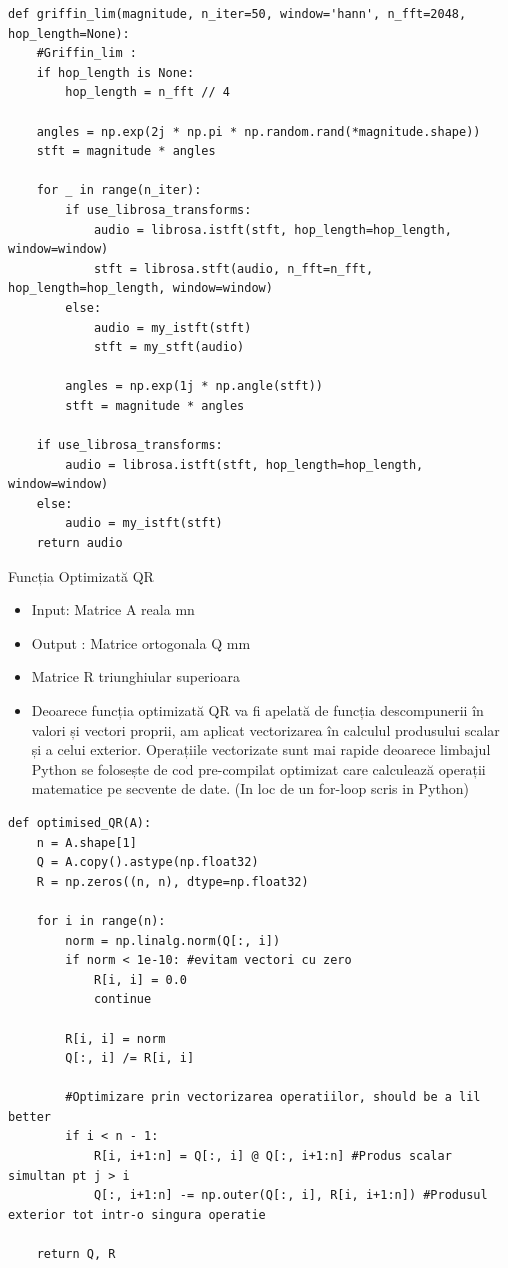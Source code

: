 \documentclass[12pt]{article}
\begin{document}
\begin{lstlisting}
def griffin_lim(magnitude, n_iter=50, window='hann', n_fft=2048, hop_length=None):
    #Griffin_lim : 
    if hop_length is None:
        hop_length = n_fft // 4
        
    angles = np.exp(2j * np.pi * np.random.rand(*magnitude.shape))
    stft = magnitude * angles
    
    for _ in range(n_iter):
        if use_librosa_transforms:
            audio = librosa.istft(stft, hop_length=hop_length, window=window)
            stft = librosa.stft(audio, n_fft=n_fft, hop_length=hop_length, window=window)
        else:
            audio = my_istft(stft)
            stft = my_stft(audio)
        
        angles = np.exp(1j * np.angle(stft))
        stft = magnitude * angles
        
    if use_librosa_transforms:
        audio = librosa.istft(stft, hop_length=hop_length, window=window)
    else:
        audio = my_istft(stft)
    return audio
\end{lstlisting}

Funcția Optimizată QR
\begin{itemize}
    \item Input: Matrice A reala mn
    \item Output : Matrice ortogonala Q mm
    \item Matrice R triunghiular superioara
    \item Deoarece funcția optimizată QR va fi apelată de funcția descompunerii în valori și vectori proprii, am aplicat vectorizarea în calculul produsului scalar și a celui exterior. Operațiile vectorizate sunt mai rapide deoarece limbajul Python se folosește de cod pre-compilat optimizat care calculează operații matematice pe secvente de date. (In loc de un for-loop scris in Python) 
\end{itemize}

\begin{lstlisting}
def optimised_QR(A):
    n = A.shape[1]
    Q = A.copy().astype(np.float32)
    R = np.zeros((n, n), dtype=np.float32)

    for i in range(n):
        norm = np.linalg.norm(Q[:, i])
        if norm < 1e-10: #evitam vectori cu zero
            R[i, i] = 0.0
            continue
        
        R[i, i] = norm
        Q[:, i] /= R[i, i]

        #Optimizare prin vectorizarea operatiilor, should be a lil better
        if i < n - 1:
            R[i, i+1:n] = Q[:, i] @ Q[:, i+1:n] #Produs scalar simultan pt j > i
            Q[:, i+1:n] -= np.outer(Q[:, i], R[i, i+1:n]) #Produsul exterior tot intr-o singura operatie

    return Q, R
\end{lstlisting}
\end{document}
